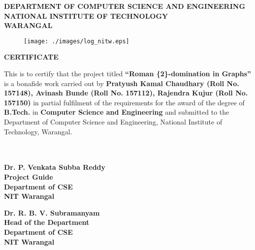 \begin{center}
{
{\bf \normalsize {DEPARTMENT OF COMPUTER SCIENCE AND ENGINEERING}}\\
{\bf \large NATIONAL INSTITUTE OF TECHNOLOGY}\\
{\bf \large WARANGAL}
} 
\vspace*{2cm}
\begin{figure}[ht]
\centering
\texttt{[image: ./images/log\_nitw.eps]}
\end{figure}
\vspace*{1cm}

{\large \bf {CERTIFICATE}}\\
\end{center}
{\normalsize
This is to certify that the project titled \textbf{\enquote{Roman \{2\}-domination in Graphs} } is a bonafide work carried out by {\bf Pratyush Kamal Chaudhary (Roll No. 157148), Avinash Bunde (Roll No. 157112), Rajendra Kujur (Roll No. 157150)} in partial fulfilment of the requirements for the award of the degree of {\bf B.Tech.} in \textbf{Computer Science and Engineering} and submitted to the {Department of Computer Science and Engineering, National Institute of Technology, Warangal}.\\ \\ \\ 

\parbox[t]{55mm}{\bf
Dr. P. Venkata Subba Reddy\\
Project Guide\\
Department of CSE\\NIT Warangal
}
\hfill
\parbox[t]{50mm}
{\bf
Dr. R. B. V. Subramanyam\\
Head of the Department\\
Department of CSE\\
NIT Warangal}
}
\newpage


















